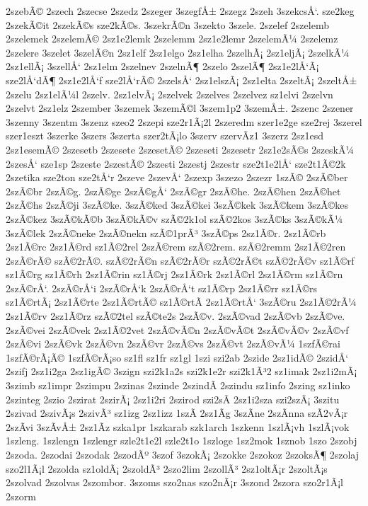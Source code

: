 {2szebÃ©
2szech
2szecse
2szedz
2szeger
3szegfÅ±
2szegz
2szeh
3szekcsÅ‘.
sze2keg
2szekÃ©it
2szekÃ©s
sze2kÃ©s.
3szekrÃ©n
3szekto
3szele.
2szelef
2szelemb
2szelemek
2szelemÃ©
2sz1e2lemk
2szelemm
2sz1e2lemr
2szelemÃ¼
2szelemz
2szelere
3szelet
3szelÃ©n
2sz1elf
2sz1elgo
2sz1elha
2szelhÃ¡
2sz1eljÃ¡
2szelkÃ¼
2sz1ellÃ¡
3szellÅ‘
2sz1elm
2szelnev
2szelnÃ¶
2szelo
2szelÃ¶
2sz1e2lÅ‘Ã¡
sze2lÅ‘dÃ¶
2sz1e2lÅ‘f
sze2lÅ‘rÃ©
2szelsÅ‘
2sz1elszÃ¡
2sz1elta
2szeltÃ¡
2szeltÅ±
2szelu
2sz1elÃ¼l
2szelv.
2sz1elvÃ¡
2szelvek
2szelves
2szelvez
sz1elvi
2szelvn
2szelvt
2sz1elz
2szember
3szemek
3szemÃ©l
3szem1p2
3szemÅ±.
2szenc
2szener
3szenny
3szentm
3szenz
szeo2
2szepi
sze2r1Ã¡2l
2szeredm
szer1e2ge
sze2rej
3szerel
szer1eszt
3szerke
3szers
3szerta
szer2tÃ¡lo
3szerv
szervÃ­z1
3szerz
2sz1esd
2sz1esemÃ©
2szesetb
2szesete
2szesetÃ©
2szeseti
2szesetr
2sz1e2sÃ©s
2szeskÃ¼
2szesÅ‘
sze1sp
2szeste
2szestÃ©
2szesti
2szestj
2szestr
sze2t1e2lÅ‘
sze2t1Ã©2k
2szetika
sze2ton
sze2tÅ‘r
2szeve
2szevÅ‘
2szexp
3szezo
2szezr
1szÃ©
2szÃ©ber
2szÃ©br
2szÃ©g.
2szÃ©ge
2szÃ©gÅ‘
2szÃ©gr
2szÃ©he.
2szÃ©hen
2szÃ©het
2szÃ©hs
2szÃ©ji
3szÃ©ke.
3szÃ©ked
3szÃ©kei
3szÃ©kek
3szÃ©kem
3szÃ©kes
2szÃ©kez
3szÃ©kÃ©b
3szÃ©kÃ©v
szÃ©2k1ol
szÃ©2kos
3szÃ©ks
3szÃ©kÃ¼
3szÃ©lek
2szÃ©neke
2szÃ©nekn
szÃ©1prÃ³
3szÃ©ps
2sz1Ã©r.
2sz1Ã©rb
2sz1Ã©rc
2sz1Ã©rd
sz1Ã©2rel
2szÃ©rem
szÃ©2rem.
szÃ©2remm
2sz1Ã©2ren
2szÃ©rÃ©
szÃ©2rÃ©.
szÃ©2rÃ©n
szÃ©2rÃ©r
szÃ©2rÃ©t
szÃ©2rÃ©v
sz1Ã©rf
sz1Ã©rg
sz1Ã©rh
2sz1Ã©rin
sz1Ã©rj
2sz1Ã©rk
2sz1Ã©rl
2sz1Ã©rm
sz1Ã©rn
2szÃ©rÅ‘.
2szÃ©rÅ‘i
2szÃ©rÅ‘k
2szÃ©rÅ‘t
sz1Ã©rp
2sz1Ã©rr
sz1Ã©rs
sz1Ã©rtÃ¡
2sz1Ã©rte
2sz1Ã©rtÃ©
sz1Ã©rtÃ­
2sz1Ã©rtÅ‘
3szÃ©ru
2sz1Ã©2rÃ¼
2sz1Ã©rv
2sz1Ã©rz
szÃ©2tel
szÃ©te2s
2szÃ©v.
2szÃ©vad
2szÃ©vb
2szÃ©ve.
2szÃ©vei
2szÃ©vek
2sz1Ã©2vet
2szÃ©vÃ©n
2szÃ©vÃ©t
2szÃ©vÃ©v
2szÃ©vf
2szÃ©vi
2szÃ©vk
2szÃ©vn
2szÃ©vr
2szÃ©vs
2szÃ©vt
2szÃ©vÃ¼
1szfÃ©rai
1szfÃ©rÃ¡Ã©
1szfÃ©rÃ¡so
sz1fl
sz1fr
sz1gl
1szi
szi2ab
2szide
2sz1idÃ©
2szidÅ‘
2szifj
2sz1i2ga
2sz1igÃ©
3szign
szi2k1a2s
szi2k1e2r
szi2k1Ã³2
sz1imak
2sz1i2mÃ¡
3szimb
sz1impr
2szimpu
2szinas
2szinde
2szindÃ­
2szindu
sz1info
2szing
sz1inko
2szinteg
2szio
2szirat
2szirÃ¡
2sz1i2ri
2szirod
szi2sÃ­
2sz1i2sza
szi2szÃ¡
3szitu
2szivad
2szivÃ¡s
2szivÃ³
sz1izg
2sz1izz
1szÃ­
2sz1Ã­g
3szÃ­ne
2szÃ­nna
szÃ­2vÃ¡r
2szÃ­vi
3szÃ­vÅ±
2sz1Ã­z
szka1pr
1szkarab
szk1arch
1szkenn
1szlÃ¡vh
1szlÃ¡vok
1szleng.
1szlengn
1szlengr
szle2t1e2l
szle2t1o
1szloge
1sz2mok
1sznob
1szo
2szobj
2szoda.
2szodai
2szodak
2szodÃº
3szof
3szokÃ¡
2szokke
2szokoz
2szoksÃ¶
2szolaj
szo2l1Ã¡l
2szolda
sz1oldÃ¡
2szoldÃ³
2szo2lim
2szollÃ³
2sz1oltÃ¡r
2szoltÃ¡s
2szolvad
2szolvas
2szombor.
3szoms
szo2nas
szo2nÃ¡r
3szond
2szora
szo2r1Ã¡l
2szorm
}
